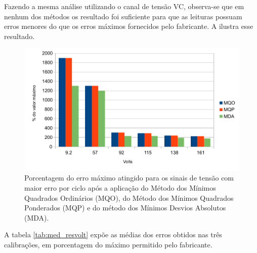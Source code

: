 Fazendo a mesma análise utilizando o canal de tensão VC, observa-se que em nenhum dos métodos os resultado foi suficiente para que as leituras possuam erros menores do que os erros máximos fornecidos pelo fabricante. A  ilustra esse resultado. 

\begin{figure}[H]
    \caption{Porcentagem do erro máximo atingido para os sinais de tensão com maior erro por ciclo após a aplicação do Método dos Mínimos Quadrados Ordinários (MQO), do Método dos Mínimos Quadrados Ponderados (MQP) e do método dos Mínimos Desvios Absolutos (MDA).}
    \label{fig:res_volt}
    \centering
    \includegraphics[width=0.9\linewidth]{pictures/max_err_VC_aftercalib60.pdf}
\end{figure}

A tabela \ref{tab:med_resvolt} expõe as médias dos erros obtidos nas três calibrações, em porcentagem do máximo permitido pelo fabricante.

\begin{table}[H]
\end{table}

